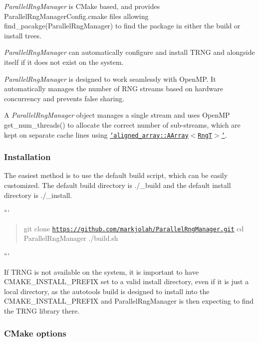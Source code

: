 \begin{DoxyItemize}
\item {\itshape Parallel\-Rng\-Manager} is C\-Make based, and provides {\ttfamily Parallel\-Rng\-Manager\-Config.\-cmake} files allowing {\ttfamily find\-\_\-pacakge(\-Parallel\-Rng\-Manager)} to find the package in either the build or install trees.
\item {\itshape Parallel\-Rng\-Manager} can automatically configure and install T\-R\-N\-G and alongside itself if it does not exist on the system.
\item {\itshape Parallel\-Rng\-Manager} is designed to work seamlessly with Open\-M\-P. It automatically manages the number of R\-N\-G streams based on hardware concurrency and prevents false sharing.
\item A {\itshape Parallel\-Rng\-Manager} object manages a single stream and uses Open\-M\-P {\ttfamily get\-\_\-num\-\_\-threads()} to allocate the correct number of sub-\/streams, which are kept on separate cache lines using \href{https://github.com/markjolah/AlignedArray}{\tt `aligned\-\_\-array\-::\-A\-Array$<$\-Rng\-T$>$`}.
\end{DoxyItemize}

\subsubsection*{Installation}

The easiest method is to use the default build script, which can be easily customized. The default build directory is {\ttfamily ./\-\_\-build} and the default install directory is {\ttfamily ./\-\_\-install}.

``` \begin{quotation}
git clone \href{https://github.com/markjolah/ParallelRngManager.git}{\tt https\-://github.\-com/markjolah/\-Parallel\-Rng\-Manager.\-git} cd Parallel\-Rng\-Manager ./build.sh

\end{quotation}
```

If T\-R\-N\-G is not available on the system, it is important to have {\ttfamily C\-M\-A\-K\-E\-\_\-\-I\-N\-S\-T\-A\-L\-L\-\_\-\-P\-R\-E\-F\-I\-X} set to a valid install directory, even if it is just a local directory, as the autotools build is designed to install into the {\ttfamily C\-M\-A\-K\-E\-\_\-\-I\-N\-S\-T\-A\-L\-L\-\_\-\-P\-R\-E\-F\-I\-X} and Parallel\-Rng\-Manager is then expecting to find the T\-R\-N\-G library there.

\subsubsection*{C\-Make options}

